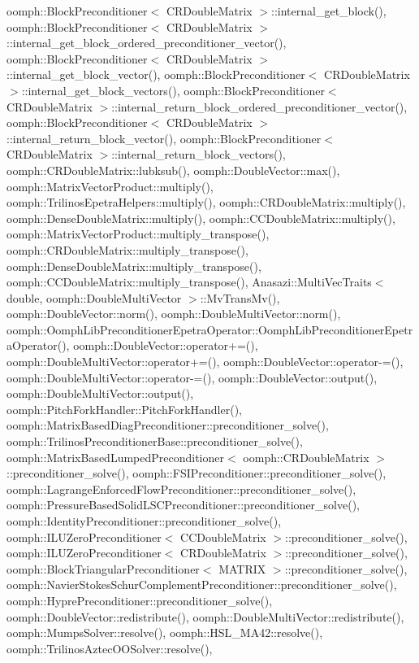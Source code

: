 oomph\+::\+Block\+Preconditioner$<$ C\+R\+Double\+Matrix $>$\+::internal\+\_\+get\+\_\+block(), oomph\+::\+Block\+Preconditioner$<$ C\+R\+Double\+Matrix $>$\+::internal\+\_\+get\+\_\+block\+\_\+ordered\+\_\+preconditioner\+\_\+vector(), oomph\+::\+Block\+Preconditioner$<$ C\+R\+Double\+Matrix $>$\+::internal\+\_\+get\+\_\+block\+\_\+vector(), oomph\+::\+Block\+Preconditioner$<$ C\+R\+Double\+Matrix $>$\+::internal\+\_\+get\+\_\+block\+\_\+vectors(), oomph\+::\+Block\+Preconditioner$<$ C\+R\+Double\+Matrix $>$\+::internal\+\_\+return\+\_\+block\+\_\+ordered\+\_\+preconditioner\+\_\+vector(), oomph\+::\+Block\+Preconditioner$<$ C\+R\+Double\+Matrix $>$\+::internal\+\_\+return\+\_\+block\+\_\+vector(), oomph\+::\+Block\+Preconditioner$<$ C\+R\+Double\+Matrix $>$\+::internal\+\_\+return\+\_\+block\+\_\+vectors(), oomph\+::\+C\+R\+Double\+Matrix\+::lubksub(), oomph\+::\+Double\+Vector\+::max(), oomph\+::\+Matrix\+Vector\+Product\+::multiply(), oomph\+::\+Trilinos\+Epetra\+Helpers\+::multiply(), oomph\+::\+C\+R\+Double\+Matrix\+::multiply(), oomph\+::\+Dense\+Double\+Matrix\+::multiply(), oomph\+::\+C\+C\+Double\+Matrix\+::multiply(), oomph\+::\+Matrix\+Vector\+Product\+::multiply\+\_\+transpose(), oomph\+::\+C\+R\+Double\+Matrix\+::multiply\+\_\+transpose(), oomph\+::\+Dense\+Double\+Matrix\+::multiply\+\_\+transpose(), oomph\+::\+C\+C\+Double\+Matrix\+::multiply\+\_\+transpose(), Anasazi\+::\+Multi\+Vec\+Traits$<$ double, oomph\+::\+Double\+Multi\+Vector $>$\+::\+Mv\+Trans\+Mv(), oomph\+::\+Double\+Vector\+::norm(), oomph\+::\+Double\+Multi\+Vector\+::norm(), oomph\+::\+Oomph\+Lib\+Preconditioner\+Epetra\+Operator\+::\+Oomph\+Lib\+Preconditioner\+Epetra\+Operator(), oomph\+::\+Double\+Vector\+::operator+=(), oomph\+::\+Double\+Multi\+Vector\+::operator+=(), oomph\+::\+Double\+Vector\+::operator-\/=(), oomph\+::\+Double\+Multi\+Vector\+::operator-\/=(), oomph\+::\+Double\+Vector\+::output(), oomph\+::\+Double\+Multi\+Vector\+::output(), oomph\+::\+Pitch\+Fork\+Handler\+::\+Pitch\+Fork\+Handler(), oomph\+::\+Matrix\+Based\+Diag\+Preconditioner\+::preconditioner\+\_\+solve(), oomph\+::\+Trilinos\+Preconditioner\+Base\+::preconditioner\+\_\+solve(), oomph\+::\+Matrix\+Based\+Lumped\+Preconditioner$<$ oomph\+::\+C\+R\+Double\+Matrix $>$\+::preconditioner\+\_\+solve(), oomph\+::\+F\+S\+I\+Preconditioner\+::preconditioner\+\_\+solve(), oomph\+::\+Lagrange\+Enforced\+Flow\+Preconditioner\+::preconditioner\+\_\+solve(), oomph\+::\+Pressure\+Based\+Solid\+L\+S\+C\+Preconditioner\+::preconditioner\+\_\+solve(), oomph\+::\+Identity\+Preconditioner\+::preconditioner\+\_\+solve(), oomph\+::\+I\+L\+U\+Zero\+Preconditioner$<$ C\+C\+Double\+Matrix $>$\+::preconditioner\+\_\+solve(), oomph\+::\+I\+L\+U\+Zero\+Preconditioner$<$ C\+R\+Double\+Matrix $>$\+::preconditioner\+\_\+solve(), oomph\+::\+Block\+Triangular\+Preconditioner$<$ M\+A\+T\+R\+I\+X $>$\+::preconditioner\+\_\+solve(), oomph\+::\+Navier\+Stokes\+Schur\+Complement\+Preconditioner\+::preconditioner\+\_\+solve(), oomph\+::\+Hypre\+Preconditioner\+::preconditioner\+\_\+solve(), oomph\+::\+Double\+Vector\+::redistribute(), oomph\+::\+Double\+Multi\+Vector\+::redistribute(), oomph\+::\+Mumps\+Solver\+::resolve(), oomph\+::\+H\+S\+L\+\_\+\+M\+A42\+::resolve(), oomph\+::\+Trilinos\+Aztec\+O\+O\+Solver\+::resolve(), 